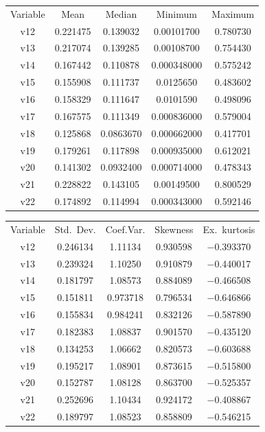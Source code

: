 \documentclass[10pt, a4paper]{article}
\begin{document}
\begin{appendices}
\begin{table}[H]
\begin{center}
	\begin{tabular}{|c|c|c|c|c|}
		Variable & {Mean}& {Median}  & {Minimum}    & {Maximum} \\[1ex]
		v12 & 0.221475 & 0.139032 & 0.00101700 & 0.780730\\
		v13 & 0.217074 & 0.139285 & 0.00108700 & 0.754430\\
		v14 & 0.167442 & 0.110878 & 0.000348000 & 0.575242\\
		v15 & 0.155908 & 0.111737 & 0.0125650 & 0.483602\\
		v16 & 0.158329 & 0.111647 & 0.0101590 & 0.498096\\
		v17 & 0.167575 & 0.111349 & 0.000836000 & 0.579004\\
		v18 & 0.125868 & 0.0863670 & 0.000662000 & 0.417701\\
		v19 & 0.179261 & 0.117898 & 0.000935000 & 0.612021\\
		v20 & 0.141302 & 0.0932400 & 0.000714000 & 0.478343\\
		v21 & 0.228822 & 0.143105 & 0.00149500 & 0.800529\\
		v22 & 0.174892 & 0.114994 & 0.000343000 & 0.592146\\ \hline\hline
	\end{tabular}
	\begin{tabular}{|c|c|c|c|c|}
		\rowcolors{1}{Lavender}{MintCream}
		Variable &  {Std.\ Dev.}  & {Coef.Var.}   & {Skewness}    & {Ex.\ kurtosis} \\[1ex]
		v12 & 0.246134 & 1.11134 & 0.930598 & $-$0.393370\\
		v13 & 0.239324 & 1.10250 & 0.910879 & $-$0.440017\\
		v14 & 0.181797 & 1.08573 & 0.884089 & $-$0.466508\\
		v15 & 0.151811 & 0.973718 & 0.796534 & $-$0.646866\\
		v16 & 0.155834 & 0.984241 & 0.832126 & $-$0.587890\\
		v17 & 0.182383 & 1.08837 & 0.901570 & $-$0.435120\\
		v18 & 0.134253 & 1.06662 & 0.820573 & $-$0.603688\\
		v19 & 0.195217 & 1.08901 & 0.873615 & $-$0.515800\\
		v20 & 0.152787 & 1.08128 & 0.863700 & $-$0.525357\\
		v21 & 0.252696 & 1.10434 & 0.924172 & $-$0.408867\\
		v22 & 0.189797 & 1.08523 & 0.858809 & $-$0.546215\\
	\end{tabular}
	\end{center}
	

\end{table}
\end{appendices}
\end{document}
